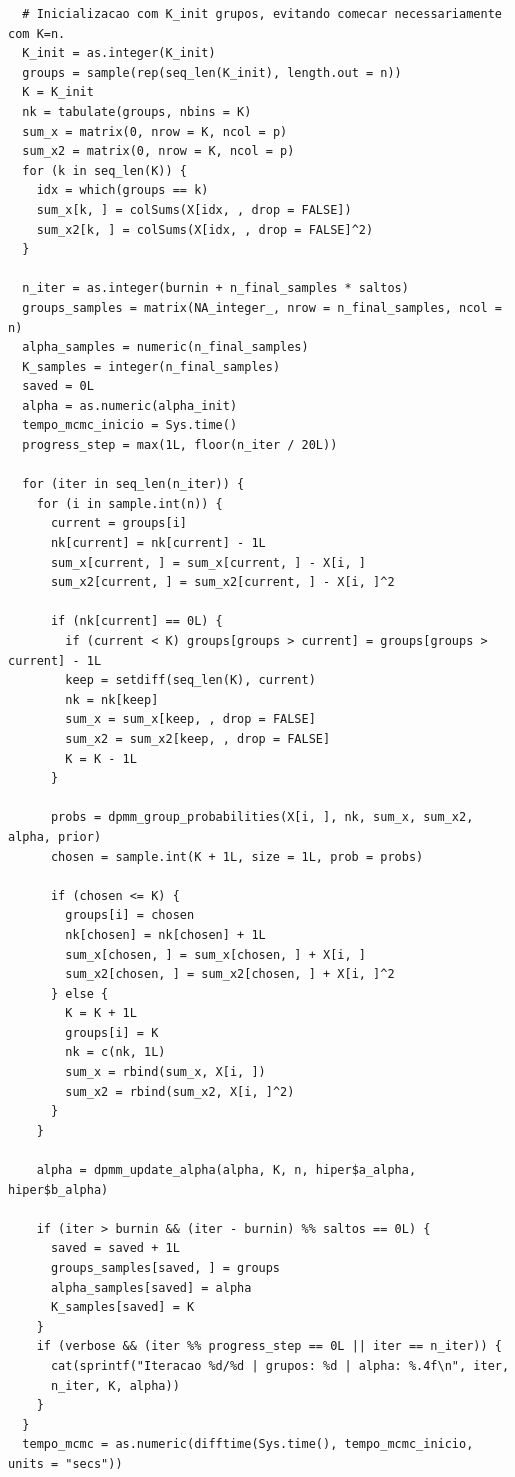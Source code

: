 \begin{verbatim}
  # Inicializacao com K_init grupos, evitando comecar necessariamente com K=n.
  K_init = as.integer(K_init)
  groups = sample(rep(seq_len(K_init), length.out = n))
  K = K_init
  nk = tabulate(groups, nbins = K)
  sum_x = matrix(0, nrow = K, ncol = p)
  sum_x2 = matrix(0, nrow = K, ncol = p)
  for (k in seq_len(K)) {
    idx = which(groups == k)
    sum_x[k, ] = colSums(X[idx, , drop = FALSE])
    sum_x2[k, ] = colSums(X[idx, , drop = FALSE]^2)
  }
  
  n_iter = as.integer(burnin + n_final_samples * saltos)
  groups_samples = matrix(NA_integer_, nrow = n_final_samples, ncol = n)
  alpha_samples = numeric(n_final_samples)
  K_samples = integer(n_final_samples)
  saved = 0L
  alpha = as.numeric(alpha_init)
  tempo_mcmc_inicio = Sys.time()
  progress_step = max(1L, floor(n_iter / 20L))
  
  for (iter in seq_len(n_iter)) {
    for (i in sample.int(n)) {
      current = groups[i]
      nk[current] = nk[current] - 1L
      sum_x[current, ] = sum_x[current, ] - X[i, ]
      sum_x2[current, ] = sum_x2[current, ] - X[i, ]^2
      
      if (nk[current] == 0L) {
        if (current < K) groups[groups > current] = groups[groups > current] - 1L
        keep = setdiff(seq_len(K), current)
        nk = nk[keep]
        sum_x = sum_x[keep, , drop = FALSE]
        sum_x2 = sum_x2[keep, , drop = FALSE]
        K = K - 1L
      }
      
      probs = dpmm_group_probabilities(X[i, ], nk, sum_x, sum_x2, alpha, prior)
      chosen = sample.int(K + 1L, size = 1L, prob = probs)
      
      if (chosen <= K) {
        groups[i] = chosen
        nk[chosen] = nk[chosen] + 1L
        sum_x[chosen, ] = sum_x[chosen, ] + X[i, ]
        sum_x2[chosen, ] = sum_x2[chosen, ] + X[i, ]^2
      } else {
        K = K + 1L
        groups[i] = K
        nk = c(nk, 1L)
        sum_x = rbind(sum_x, X[i, ])
        sum_x2 = rbind(sum_x2, X[i, ]^2)
      }
    }
    
    alpha = dpmm_update_alpha(alpha, K, n, hiper$a_alpha, hiper$b_alpha)
    
    if (iter > burnin && (iter - burnin) %% saltos == 0L) {
      saved = saved + 1L
      groups_samples[saved, ] = groups
      alpha_samples[saved] = alpha
      K_samples[saved] = K
    }
    if (verbose && (iter %% progress_step == 0L || iter == n_iter)) {
      cat(sprintf("Iteracao %d/%d | grupos: %d | alpha: %.4f\n", iter, 
      n_iter, K, alpha))
    }
  }
  tempo_mcmc = as.numeric(difftime(Sys.time(), tempo_mcmc_inicio, units = "secs"))
  

\end{verbatim}
